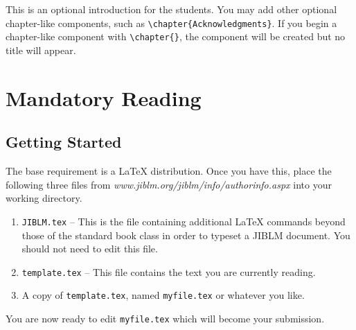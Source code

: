 \documentclass[oneside]{book}
\begin{document}
This is an optional introduction for the students.  You may add other
optional chapter-like components, such as
\verb|\chapter{Acknowledgments}|.  If you begin a chapter-like
component with \verb|\chapter{}|, the component will be created but
no title will appear.




\mainmatter




\chapter{Mandatory Reading}

\section{Getting Started}

The base requirement is  a \LaTeX{} distribution. Once you have this, place the following
three files from \emph{www.jiblm.org/jiblm/info/authorinfo.aspx} into your working directory.

\begin{enumerate}
    \item \texttt{JIBLM.tex} -- This is the file containing additional \LaTeX{} commands
    beyond those of the standard book class in order to typeset a JIBLM document.  You should not need
    to edit this file.
    \item \texttt{template.tex} -- This file contains the text you are currently reading.
    \item A copy of \texttt{template.tex}, named \texttt{myfile.tex} or whatever you like.
\end{enumerate}

\noindent
You are now ready to edit \texttt{myfile.tex} which will become your submission.
\end{document}
